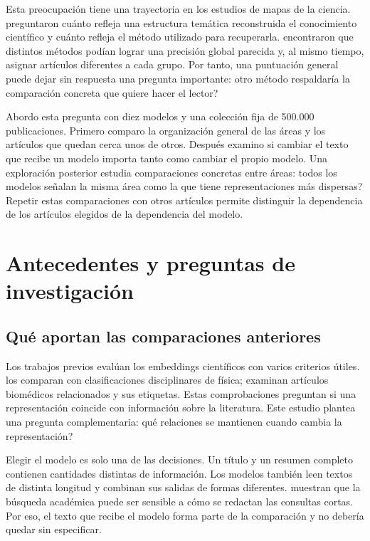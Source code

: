 Esta preocupación tiene una trayectoria en los estudios de mapas de la ciencia. \citet{refa0d2d707e6} preguntaron cuánto refleja una estructura temática reconstruida el conocimiento científico y cuánto refleja el método utilizado para recuperarla. \citet{ref6a2f5912bc} encontraron que distintos métodos podían lograr una precisión global parecida y, al mismo tiempo, asignar artículos diferentes a cada grupo. Por tanto, una puntuación general puede dejar sin respuesta una pregunta importante: \textquestiondown{}otro método respaldaría la comparación concreta que quiere hacer el lector?

Abordo esta pregunta con diez modelos y una colección fija de 500.000 publicaciones. Primero comparo la organización general de las áreas y los artículos que quedan cerca unos de otros. Después examino si cambiar el texto que recibe un modelo importa tanto como cambiar el propio modelo. Una exploración posterior estudia comparaciones concretas entre áreas: \textquestiondown{}todos los modelos señalan la misma área como la que tiene representaciones más dispersas? Repetir estas comparaciones con otros artículos permite distinguir la dependencia de los artículos elegidos de la dependencia del modelo.

\section{Antecedentes y preguntas de investigación}
\subsection{Qué aportan las comparaciones anteriores}
Los trabajos previos evalúan los embeddings científicos con varios criterios útiles. \citet{refc0e2cc29e0} los comparan con clasificaciones disciplinares de física; \citet{refbe130e2973} examinan artículos biomédicos relacionados y sus etiquetas. Estas comprobaciones preguntan si una representación coincide con información sobre la literatura. Este estudio plantea una pregunta complementaria: \textquestiondown{}qué relaciones se mantienen cuando cambia la representación?

Elegir el modelo es solo una de las decisiones. Un título y un resumen completo contienen cantidades distintas de información. Los modelos también leen textos de distinta longitud y combinan sus salidas de formas diferentes. \citet{singh-singh-2022-inefficiency} muestran que la búsqueda académica puede ser sensible a cómo se redactan las consultas cortas. Por eso, el texto que recibe el modelo forma parte de la comparación y no debería quedar sin especificar.

